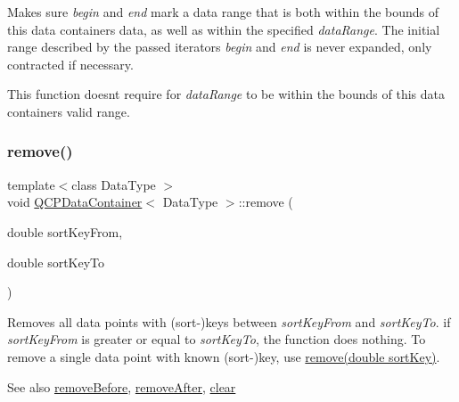 Makes sure {\itshape begin} and {\itshape end} mark a data range that is both within the bounds of this data container\textquotesingle{}s data, as well as within the specified {\itshape data\+Range}. The initial range described by the passed iterators {\itshape begin} and {\itshape end} is never expanded, only contracted if necessary.

This function doesn\textquotesingle{}t require for {\itshape data\+Range} to be within the bounds of this data container\textquotesingle{}s valid range. \mbox{\label{classQCPDataContainer_ae5f569a120648b167efa78835f12fd38}} 
\subsubsection{\texorpdfstring{remove()}{remove()}\hspace{0.1cm}{\footnotesize\ttfamily [1/2]}}
{\footnotesize\ttfamily template$<$class Data\+Type $>$ \\
void \hyperlink{classQCPDataContainer}{Q\+C\+P\+Data\+Container}$<$ Data\+Type $>$\+::remove (\begin{DoxyParamCaption}\item[{double}]{sort\+Key\+From,  }\item[{double}]{sort\+Key\+To }\end{DoxyParamCaption})}

Removes all data points with (sort-\/)keys between {\itshape sort\+Key\+From} and {\itshape sort\+Key\+To}. if {\itshape sort\+Key\+From} is greater or equal to {\itshape sort\+Key\+To}, the function does nothing. To remove a single data point with known (sort-\/)key, use \hyperlink{classQCPDataContainer_a2dbded7f0732bacf9db48fdfbbb620bc}{remove(double sort\+Key)}.

\begin{DoxySeeAlso}{See also}
\hyperlink{classQCPDataContainer_aa7f74cbce304b0369e1626c3798e1eda}{remove\+Before}, \hyperlink{classQCPDataContainer_abbe5d87ffc10b5aeffa5bb42cf03aa3c}{remove\+After}, \hyperlink{classQCPDataContainer_a7e2b29736c6fd761649bda1a54ba967f}{clear} 
\end{DoxySeeAlso}
\mbox{\label{classQCPDataContainer_a2dbded7f0732bacf9db48fdfbbb620bc}} 
